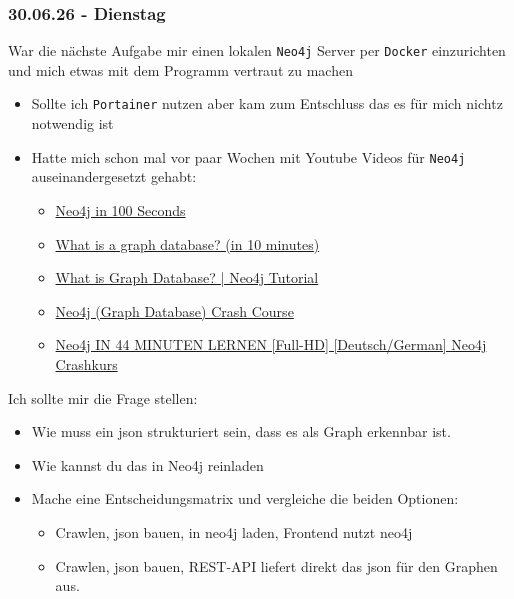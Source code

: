 \subsubsection{30.06.26 - Dienstag}

War die nächste Aufgabe mir einen lokalen \texttt{Neo4j} Server per \texttt{Docker} einzurichten und mich etwas mit dem Programm vertraut zu machen

\begin{itemize}
  \item Sollte ich \texttt{Portainer} nutzen aber kam zum Entschluss das es für mich nichtz notwendig ist
  \item Hatte mich schon mal vor paar Wochen mit Youtube Videos für \texttt{Neo4j} auseinandergesetzt gehabt:
    \begin{itemize}
      \item \href{https://youtu.be/T6L9EoBy8Zk?si=zv2459hfS2osTfwN}{Neo4j in 100 Seconds}
      \item \href{https://youtu.be/REVkXVxvMQE?si=PhiNwcv7IfhSqP7F}{What is a graph database? (in 10 minutes)}
      \item \href{https://youtu.be/xKVA2gL8WHs?si=vl_GM4LRAZQXngy5}{What is Graph Database? | Neo4j Tutorial}
      \item \href{https://youtu.be/8jNPelugC2s?si=W0dSuiQ8L1hrWGmZ}{Neo4j (Graph Database) Crash Course}
      \item \href{https://youtu.be/P8VsJgbfWFw?si=x_abHF4SYK3pHdBG}{Neo4j IN 44 MINUTEN LERNEN [Full-HD] [Deutsch/German] Neo4j Crashkurs}
    \end{itemize}
\end{itemize}

Ich sollte mir die Frage stellen:

\begin{itemize}
  \item Wie muss ein json strukturiert sein, dass es als Graph erkennbar ist.
  \item Wie kannst du das in Neo4j reinladen
  \item Mache eine Entscheidungsmatrix und vergleiche die beiden Optionen:
    \begin{itemize}
      \item Crawlen, json bauen, in neo4j laden, Frontend nutzt neo4j
      \item Crawlen, json bauen, REST-API liefert direkt das json für den Graphen aus.
    \end{itemize}
\end{itemize}

